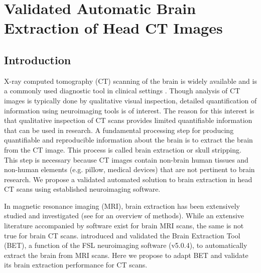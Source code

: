















\chapter{Validated Automatic Brain Extraction of Head CT Images}
\label{chap:ss}


\section{Introduction}

X-ray computed tomography (CT) scanning of the brain is widely available and is a commonly used diagnostic tool in clinical settings \citep{sahni_management_2007, chalela2007magnetic, schellinger1999standardized}. Though analysis of CT images is typically done by qualitative visual inspection, detailed quantification of information using neuroimaging tools is of interest.  The reason for this interest is that qualitative inspection of CT scans provides limited quantifiable information that can be used in research. A fundamental processing step for producing quantifiable and  reproducible information about the brain is to extract the brain from the CT image. This process is called brain extraction or skull stripping.  This step is necessary because CT images contain non-brain human tissues and non-human elements (e.g. pillow, medical devices) that are not pertinent to brain research.  We propose a validated automated solution to brain extraction in head CT scans using established neuroimaging software.

In magnetic resonance imaging (MRI), brain extraction has been extensively studied and investigated (see \citet{wang2014knowledge} for an overview of methods).  While an extensive literature accompanied by software exist for brain MRI scans, the same is not true for brain CT scans.  \citet{smith_fast_2002} introduced and validated the Brain Extraction Tool (BET), a function of the FSL \citep{jenkinson_fsl_2012} neuroimaging software (v5.0.4), to automatically extract the brain from MRI scans.  Here we propose to adapt BET and validate its brain extraction performance for CT scans.  

